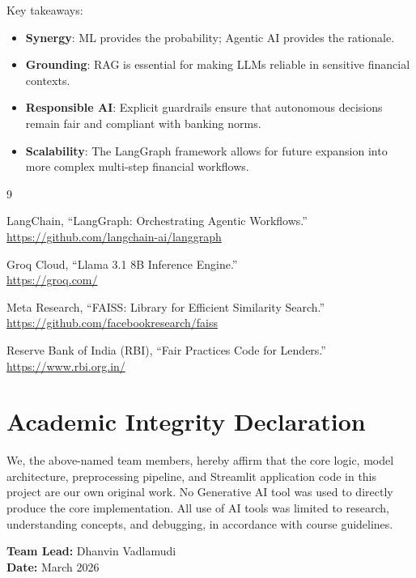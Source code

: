 \documentclass[12pt, a4paper]{article}
\begin{document}
Key takeaways:
\begin{itemize}[leftmargin=2cm]
  \item \textbf{Synergy}: ML provides the probability; Agentic AI provides the rationale.
  \item \textbf{Grounding}: RAG is essential for making LLMs reliable in sensitive financial contexts.
  \item \textbf{Responsible AI}: Explicit guardrails ensure that autonomous decisions remain fair and compliant with banking norms.
  \item \textbf{Scalability}: The LangGraph framework allows for future expansion into more complex multi-step financial workflows.
\end{itemize}

\begin{thebibliography}{9}

LangChain, ``LangGraph: Orchestrating Agentic Workflows.'' \\
\url{https://github.com/langchain-ai/langgraph}

Groq Cloud, ``Llama 3.1 8B Inference Engine.'' \\
\url{https://groq.com/}

Meta Research, ``FAISS: Library for Efficient Similarity Search.'' \\
\url{https://github.com/facebookresearch/faiss}

Reserve Bank of India (RBI), ``Fair Practices Code for Lenders.'' \\
\url{https://www.rbi.org.in/}

\end{thebibliography}

\section*{Academic Integrity Declaration}

We, the above-named team members, hereby affirm that the core logic, model architecture, preprocessing pipeline, and Streamlit application code in this project are our own original work. No Generative AI tool was used to directly produce the core implementation. All use of AI tools was limited to research, understanding concepts, and debugging, in accordance with course guidelines.

\vspace{1cm}

\noindent
\textbf{Team Lead:} Dhanvin Vadlamudi \\
\textbf{Date:} March 2026
\end{document}
